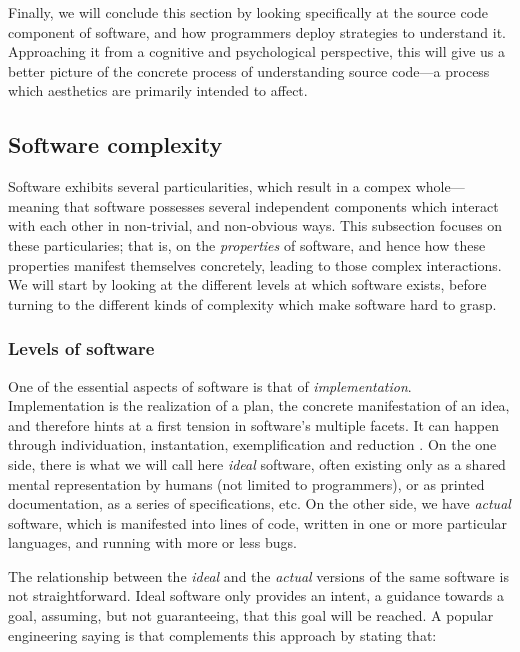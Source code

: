 Finally, we will conclude this section by looking specifically at the source code component of software, and how programmers deploy strategies to understand it. Approaching it from a cognitive and psychological perspective, this will give us a better picture of the concrete process of understanding source code—a process which aesthetics are primarily intended to affect.

\subsection{Software complexity}
\label{subsec:software-complexity}

Software exhibits several particularities, which result in a compex whole—meaning that software possesses several independent components which interact with each other in non-trivial, and non-obvious ways. This subsection focuses on these particularies; that is, on the \emph{properties} of software, and hence how these properties manifest themselves concretely, leading to those complex interactions. We will start by looking at the different levels at which software exists, before turning to the different kinds of complexity which make software hard to grasp.

\subsubsection{Levels of software}
\label{subsubsec:levels-software}

One of the essential aspects of software is that of \emph{implementation}. Implementation is the realization of a plan, the concrete manifestation of an idea, and therefore hints at a first tension in software's multiple facets. It can happen through individuation, instantation, exemplification and reduction \citep{rapaport_philosophy_2005}. On the one side, there is what we will call here \emph{ideal} software, often existing only as a shared mental representation by humans (not limited to programmers), or as printed documentation, as a series of specifications, etc. On the other side, we have \emph{actual} software, which is manifested into lines of code, written in one or more particular languages, and running with more or less bugs.

The relationship between the \emph{ideal} and the \emph{actual} versions of the same software is not straightforward. Ideal software only provides an intent, a guidance towards a goal, assuming, but not guaranteeing, that this goal will be reached. A popular engineering saying is that complements this approach by stating that:

